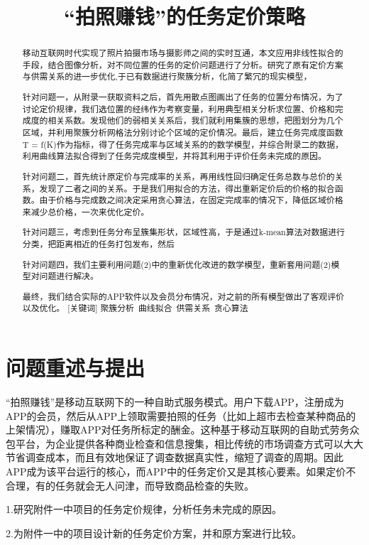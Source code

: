 \documentclass{ctexart}
\title{“拍照赚钱”的任务定价策略}
\date{}
\begin{document}
\maketitle
\begin{abstract}
移动互联网时代实现了照片拍摄市场与摄影师之间的实时互通，本文应用非线性拟合的手段，结合图像分析，对不同位置的任务的定价问题进行了分析。研究了原有定价方案与供需关系的进一步优化,于已有数据进行聚簇分析，化简了繁冗的现实模型，

针对问题一，从附录一获取资料之后，首先用散点图画出了任务的位置分布情况，为了讨论定价规律，我们选位置的经纬作为考察变量，利用典型相关分析求位置、价格和完成度的相关系数。发现他们的弱相关关系后，我们就利用集簇的思想，把图划分为几个区域，并利用聚簇分析网格法分别讨论个区域的定价情况。最后，建立任务完成度函数T = f(K)作为指标，得了任务完成率与区域关系的的数学模型，并综合附录二的数据，利用曲线算法拟合得到了任务完成度模型，并将其利用于评价任务未完成的原因。

针对问题二，首先统计原定价与完成率的关系，再用线性回归确定任务总数与总价的关系，发现了二者之间的关系。于是我们用拟合的方法，得出重新定价后的价格的拟合函数。由于价格与完成数之间决定采用贪心算法，在固定完成率的情况下，降低区域价格来减少总价格，一次来优化定价。

针对问题三，考虑到任务分布呈簇集形状，区域性高，于是通过k-mean算法对数据进行分类，把距离相近的任务打包发布，然后

针对问题四，我们主要利用问题(2)中的重新优化改进的数学模型，重新套用问题(2)模型对问题进行解决。

最终，我们结合实际的APP软件以及会员分布情况，对之前的所有模型做出了客观评价以及优化。
[关键词] 聚簇分析\ 曲线拟合\ 供需关系\ 贪心算法\ 
\end{abstract}
\newpage
\section{问题重述与提出}
“拍照赚钱”是移动互联网下的一种自助式服务模式。用户下载APP，注册成为APP的会员，然后从APP上领取需要拍照的任务（比如上超市去检查某种商品的上架情况），赚取APP对任务所标定的酬金。这种基于移动互联网的自助式劳务众包平台，为企业提供各种商业检查和信息搜集，相比传统的市场调查方式可以大大节省调查成本，而且有效地保证了调查数据真实性，缩短了调查的周期。因此APP成为该平台运行的核心，而APP中的任务定价又是其核心要素。如果定价不合理，有的任务就会无人问津，而导致商品检查的失败。

1.研究附件一中项目的任务定价规律，分析任务未完成的原因。

2.为附件一中的项目设计新的任务定价方案，并和原方案进行比较。
\end{document}
